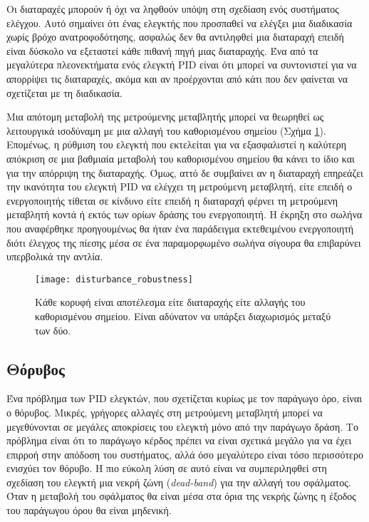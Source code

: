 Οι διαταραχές μπορούν ή όχι να ληφθούν υπόψη στη σχεδίαση ενός συστήματος ελέγχου. Αυτό σημαίνει ότι ένας ελεγκτής που προσπαθεί να ελέγξει μια διαδικασία χωρίς βρόχο ανατροφοδότησης, ασφαλώς δεν θα αντιληφθεί μια διαταραχή επειδή είναι δύσκολο να εξεταστεί κάθε πιθανή πηγή μιας διαταραχής. Ένα από τα μεγαλύτερα πλεονεκτήματα ενός ελεγκτή PID είναι ότι μπορεί να συντονιστεί για να απορρίψει τις διαταραχές, ακόμα και αν προέρχονται από κάτι που δεν φαίνεται να σχετίζεται με τη διαδικασία.

Μια απότομη μεταβολή της μετρούμενης μεταβλητής μπορεί να θεωρηθεί ως λειτουργικά ισοδύναμη με μια αλλαγή του καθορισμένου σημείου (Σχήμα \ref{fig:disturbance_robustness}). Επομένως, η ρύθμιση του ελεγκτή που εκτελείται για να εξασφαλιστεί η καλύτερη απόκριση σε μια βαθμιαία μεταβολή του καθορισμένου σημείου θα κάνει το ίδιο και για την απόρριψη της διαταραχής. Όμως, αττό δε συμβαίνει αν η διαταραχή επηρεάζει την ικανότητα του ελεγκτή PID να ελέγχει τη μετρούμενη μεταβλητή, είτε επειδή ο ενεργοποιητής τίθεται σε κίνδυνο είτε επειδή η διαταραχή φέρνει τη μετρούμενη μεταβλητή κοντά ή εκτός των ορίων δράσης του ενεργοποιητή. Η έκρηξη στο σωλήνα
που αναφέρθηκε προηγουμένως θα ήταν ένα παράδειγμα εκτεθειμένου ενεργοποιητή διότι έλεγχος της πίεσης μέσα σε ένα παραμορφωμένο σωλήνα σίγουρα θα επιβαρύνει υπερβολικά την αντλία.

\begin{figure}[h]
  \centering
  \texttt{[image: disturbance\_robustness]}
  \caption{Κάθε κορυφή είναι αποτέλεσμα είτε διαταραχής είτε αλλαγής του καθορισμένου σημείου. Είναι αδύνατον να υπάρξει διαχωρισμός μεταξύ των δύο.}
  \label{fig:disturbance_robustness}
\end{figure}

\subsection{Θόρυβος}

Ένα πρόβλημα των PID ελεγκτών, που σχετίζεται κυρίως με τον παράγωγο όρο, είναι ο θόρυβος. Μικρές, γρήγορες αλλαγές στη μετρούμενη μεταβλητή μπορεί να μεγεθύνονται σε μεγάλες αποκρίσεις του ελεγκτή μόνο από την παράγωγο δράση. Το πρόβλημα είναι ότι το παράγωγο κέρδος πρέπει να είναι σχετικά μεγάλο για να έχει επιρροή στην απόδοση του συστήματος, αλλά όσο μεγαλύτερο είναι τόσο περισσότερο ενισχύει τον θόρυβο. Η πιο εύκολη λύση σε αυτό είναι να συμπεριληφθεί στη σχεδίαση του ελεγκτή μια νεκρή ζώνη (\emph{dead-band}) για την αλλαγή του σφάλματος. Όταν η μεταβολή του σφάλματος θα είναι μέσα στα όρια της νεκρής ζώνης η έξοδος του παράγωγου όρου θα είναι μηδενική.


